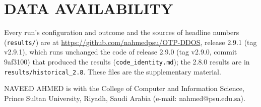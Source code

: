\documentclass{IEEEoj}
\begin{document}
\section*{DATA AVAILABILITY}
Every run's configuration and outcome and the sources of headline numbers (\texttt{results/}) are at \url{https://github.com/nahmedpsu/OTP-DDOS}, release 2.9.1 (tag v2.9.1), which runs unchanged the code of release 2.9.0 (tag v2.9.0, commit 9af3100) that produced the results (\texttt{code\_identity.md}); the 2.8.0 results are in \texttt{results/\allowbreak historical\_2.8}. These files are the supplementary material.




\begin{IEEEbiographynophoto}{NAVEED AHMED}
is with the College of Computer and Information Science, Prince Sultan University, Riyadh, Saudi Arabia (e-mail: nahmed@psu.edu.sa).
\end{IEEEbiographynophoto}
\end{document}
